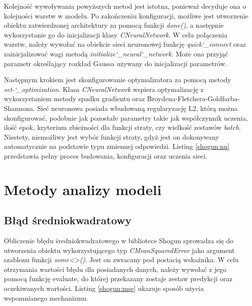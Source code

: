 Kolejność wywoływania powyższych metod jest istotna, ponieważ decyduje ona o kolejności warstw w modelu. Po zakończeniu konfiguracji, możliwe jest utworzenie obiektu zatwierdzonej architektury za pomocą funkcji \textit{done()}, a następnie wykorzystanie go do inicjalizacji klasy \textit{CNeuralNetwork}. W celu połączenia warstw, należy wywołać na obiekcie sieci neuronowej funkcję \textit{quick\char`_connect} oraz zainicjalizować wagi metodą \textit{initialize\char`_neural\char`_network}. Może ona przyjąć parametr określający rozkład Gaussa używany do inicjalizacji parametrów.

Następnym krokiem jest skonfigurowanie optymalizatora za pomocą metody \textit{set-\char`_optimization}. Klasa \textit{CNeuralNetwork} wspiera optymalizację z wykorzystaniem metody spadku gradientu oraz Broydena-Fletchera-Goldfarba-Shannona. Sieć neuronowa posiada wbudowaną regularyzację L2, którą można skonfigurować, podobnie jak pozostałe parametry takie jak współczynnik uczenia, ilość epok, kryterium zbieżności dla funkcji straty, czy wielkość zestawów \textit{batch}. Niestety, niemożliwy jest wybór funkcji straty, gdyż jest on dokonywany automatycznie na podstawie typu zmiennej odpowiedzi. Listing \ref{shogun:nn} przedstawia pełny proces budowania, konfiguracji oraz uczenia sieci.


\section{Metody analizy modeli}

\subsection{Błąd średniokwadratowy}

Obliczenie błędu średniokwadratowego w bibliotece Shogun sprowadza się do utworzenia obiektu wykorzystującego typ \textit{CMeanSquaredError} jako argument szablonu funkcji \textit{some<>()}. Jest on zwracany pod postacią wskaźnika. W celu otrzymania wartości błędu dla posiadanych danych, należy wywołać z jego pomocą funkcję evaluate, do której przekazany zostaje zestaw predykcji oraz oczekiwanych wartości. Listing \ref{shogun:mse} ukazuje sposób użycia wspomnianego mechanizmu.


